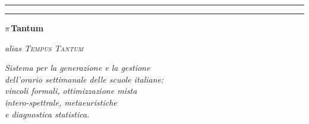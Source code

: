 %



\frontmatter

\begin{titlepage}
\thispagestyle{empty}
\centering
\vspace*{1.2cm}

\rule{0.78\textwidth}{1.2pt}\par
\vspace{2pt}
\rule{0.78\textwidth}{0.4pt}

\vspace{0.9cm}

{\fontsize{56}{60}\selectfont\rmfamily\bfseries\color{cIndaco}$\pi$\,Tantum\par}
\vspace{0.4cm}
{\Large\rmfamily\itshape\color{cInk} alias \textsc{Tempus Tantum}\par}

\vspace{0.7cm}
{\Large\color{cIndaco}\decofourleft\enskip\aldineleft\enskip\aldineright\enskip\decofourright\par}

\vspace{0.8cm}

\begin{minipage}{0.85\textwidth}
\centering\rmfamily\itshape\Large
Sistema per la generazione e la gestione\\
dell'orario settimanale delle scuole italiane:\\[0.3em]
\upshape\large\rmfamily
vincoli formali, ottimizzazione mista\\
intero-spettrale, metaeuristiche\\
e diagnostica statistica.
\end{minipage}\par


\end{titlepage}
